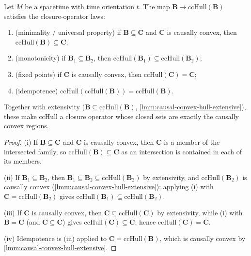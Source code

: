 \begin{theorem}
    \label{thrm:causal-convex-hull-closure}
    \leanok
    Let $M$ be a spacetime with time orientation $t$. The map $\mathbf{B} \mapsto \mathrm{ccHull}(\mathbf{B})$ satisfies the closure-operator laws:
    \begin{enumerate}
        \item (minimality / universal property) if $\mathbf{B} \subseteq \mathbf{C}$ and $\mathbf{C}$ is causally convex, then $\mathrm{ccHull}(\mathbf{B}) \subseteq \mathbf{C}$;
        \item (monotonicity) if $\mathbf{B}_1 \subseteq \mathbf{B}_2$, then $\mathrm{ccHull}(\mathbf{B}_1) \subseteq \mathrm{ccHull}(\mathbf{B}_2)$;
        \item (fixed points) if $\mathbf{C}$ is causally convex, then $\mathrm{ccHull}(\mathbf{C}) = \mathbf{C}$;
        \item (idempotence) $\mathrm{ccHull}(\mathrm{ccHull}(\mathbf{B})) = \mathrm{ccHull}(\mathbf{B})$.
    \end{enumerate}
    Together with extensivity ($\mathbf{B} \subseteq \mathrm{ccHull}(\mathbf{B})$, \ref{lmm:causal-convex-hull-extensive}), these make $\mathrm{ccHull}$ a closure operator whose closed sets are exactly the causally convex regions.
\end{theorem}
\begin{proof}
    \leanok
    (i) If $\mathbf{B} \subseteq \mathbf{C}$ and $\mathbf{C}$ is causally convex, then $\mathbf{C}$ is a member of the intersected family, so $\mathrm{ccHull}(\mathbf{B}) \subseteq \mathbf{C}$ as an intersection is contained in each of its members.

    (ii) If $\mathbf{B}_1 \subseteq \mathbf{B}_2$, then $\mathbf{B}_1 \subseteq \mathbf{B}_2 \subseteq \mathrm{ccHull}(\mathbf{B}_2)$ by extensivity, and $\mathrm{ccHull}(\mathbf{B}_2)$ is causally convex (\ref{lmm:causal-convex-hull-extensive}); applying (i) with $\mathbf{C} = \mathrm{ccHull}(\mathbf{B}_2)$ gives $\mathrm{ccHull}(\mathbf{B}_1) \subseteq \mathrm{ccHull}(\mathbf{B}_2)$.

    (iii) If $\mathbf{C}$ is causally convex, then $\mathbf{C} \subseteq \mathrm{ccHull}(\mathbf{C})$ by extensivity, while (i) with $\mathbf{B} = \mathbf{C}$ (and $\mathbf{C} \subseteq \mathbf{C}$) gives $\mathrm{ccHull}(\mathbf{C}) \subseteq \mathbf{C}$; hence $\mathrm{ccHull}(\mathbf{C}) = \mathbf{C}$.

    (iv) Idempotence is (iii) applied to $\mathbf{C} = \mathrm{ccHull}(\mathbf{B})$, which is causally convex by \ref{lmm:causal-convex-hull-extensive}.
\end{proof}


